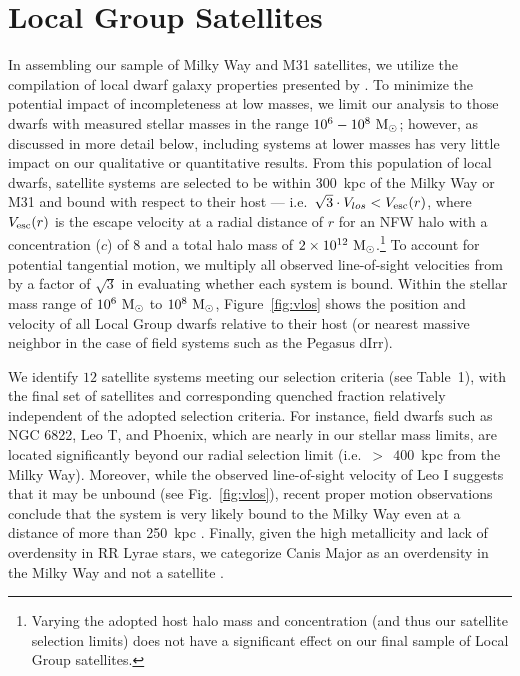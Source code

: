 \section{Local Group Satellites}
\label{sec:LG}


In assembling our sample of Milky Way and M31 satellites, we utilize
the compilation of local dwarf galaxy properties presented by
\citet{mcconnachie12}. To minimize the potential impact of
incompleteness at low masses, we limit our analysis to those dwarfs
with measured stellar masses in the range $10^{6}-10^{8}~{\rm M}_{\odot}$;
however, as discussed in more detail below, including systems at lower
masses has very little impact on our qualitative or quantitative
results. From this population of local dwarfs, satellite systems are
selected to be within $300$~kpc of the Milky Way or M31 and bound with
respect to their host --- i.e.~$\sqrt{3} \cdot V_{los} < V_{\rm
  esc}(r)$, where $V_{\rm esc}(r)$ is the escape velocity at a radial
distance of $r$ for an NFW halo with a concentration ($c$) of $8$ and
a total halo mass of $2\times 10^{12}\ \rm {\rm M}_{\odot}$.\footnote{Varying
  the adopted host halo mass and concentration (and thus our satellite
  selection limits) does not have a significant effect on our final
  sample of Local Group satellites.} To account for potential
tangential motion, we multiply all observed line-of-sight velocities
from \citet{mcconnachie12} by a factor of $\sqrt{3}$ in evaluating
whether each system is bound. Within the stellar mass range of
$10^{6}~{\rm M}_{\odot}$ to $10^{8}~{\rm M}_{\odot}$, Figure~\ref{fig:vlos} shows the
position and velocity of all Local Group dwarfs relative to their host
(or nearest massive neighbor in the case of field systems such as the
Pegasus dIrr).


We identify $12$ satellite systems meeting our selection criteria (see
Table~1), with the final set of satellites and
corresponding quenched fraction relatively independent of the adopted
selection criteria. For instance, field dwarfs such as NGC 6822, Leo
T, and Phoenix, which are nearly in our stellar mass limits, are
located significantly beyond our radial selection limit
(i.e.~$>~\!\!\!~400$~kpc from the Milky Way). Moreover, while the
observed line-of-sight velocity of Leo I suggests that it may be
unbound (see Fig.~\ref{fig:vlos}), recent proper motion observations
conclude that the system is very likely bound to the Milky Way even at
a distance of more than 250~kpc \citep{sohn13, bk13}. Finally, given
the high metallicity and lack of overdensity in RR Lyrae stars, we
categorize Canis Major as an overdensity in the Milky Way and not a
satellite \citep[][but see also \citealt{md05}]{momany04, butler07,
  mateu09}.


